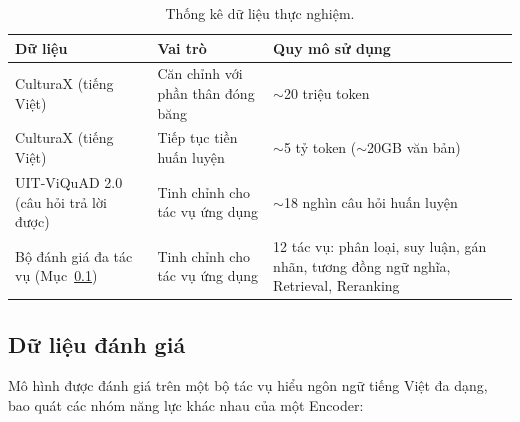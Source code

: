 \begin{table}[ht]
  \caption{Thống kê dữ liệu thực nghiệm.}
  \label{tab:data-stats}
  \centering
  \small
  \begin{tabular}{p{48mm}p{42mm}p{40mm}}
    \hline
    \textbf{Dữ liệu} & \textbf{Vai trò} & \textbf{Quy mô sử dụng} \\
    \hline
    CulturaX (tiếng Việt) & Căn chỉnh với phần thân đóng băng & $\sim$20 triệu token \\
    CulturaX (tiếng Việt) & Tiếp tục tiền huấn luyện & $\sim$5 tỷ token ($\sim$20GB văn bản) \\
    UIT-ViQuAD 2.0 (câu hỏi trả lời được) & Tinh chỉnh cho tác vụ ứng dụng & $\sim$18 nghìn câu hỏi huấn luyện \\
    Bộ đánh giá đa tác vụ (Mục~\ref{subsec:exp-eval-data}) & Tinh chỉnh cho tác vụ ứng dụng & 12 tác vụ: phân loại, suy luận, gán nhãn, tương đồng ngữ nghĩa, Retrieval, Reranking \\
    \hline
  \end{tabular}
\end{table}

\subsection{Dữ liệu đánh giá}
\label{subsec:exp-eval-data}

Mô hình được đánh giá trên một bộ tác vụ hiểu ngôn ngữ tiếng Việt đa dạng, bao quát các nhóm
năng lực khác nhau của một Encoder:

